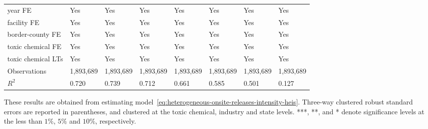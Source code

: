\begin{table}[H]
{\begin{tabular}{@{}llllllll@{}}
            year FE                         & Yes       & Yes           & Yes       & Yes          & Yes             & Yes           & Yes                 \\
            facility FE                     & Yes       & Yes           & Yes       & Yes          & Yes             & Yes           & Yes                 \\
            border-county FE                & Yes       & Yes           & Yes       & Yes          & Yes             & Yes           & Yes                 \\
            toxic chemical FE               & Yes       & Yes           & Yes       & Yes          & Yes             & Yes           & Yes                 \\
            toxic chemical LTs              & Yes       & Yes           & Yes       & Yes          & Yes             & Yes           & Yes                 \\\midrule
            Observations                    & 1,893,689 & 1,893,689     & 1,893,689 & 1,893,689    & 1,893,689       & 1,893,689     & 1,893,689           \\
            $R^2$                           & 0.720     & 0.739         & 0.712     & 0.661        & 0.585           & 0.501         & 0.127               \\ \bottomrule \bottomrule
        \end{tabular}%
    }
    \begin{minipage}{18cm}
        \vspace{0.05in}
        These results are obtained from estimating model~\ref{eq:heterogeneous-onsite-releases-intensity-heis}. Three-way clustered robust standard errors are reported in parentheses, and clustered at the toxic chemical, industry and state levels. ***, **, and * denote significance levels at the less than $1\%$, $5\%$ and $10\%$, respectively.
    \end{minipage}
\end{table}